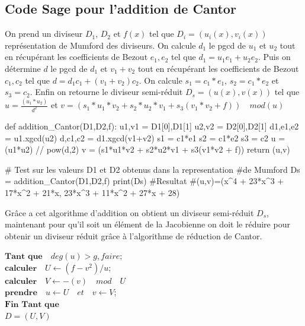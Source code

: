 \documentclass[12pt,a4paper]{article}
\begin{document}
	\subsection*{Code Sage pour l'addition de Cantor}
	On prend un diviseur $D_1$, $D_2$ et $f(x)$ tel que $D_i=(u_i(x),v_i(x))$ représentation de Mumford des diviseurs. On calcule $d_1$ le pgcd de $u_1$ et $u_2$ tout en récupérant les coefficients de Bezout $e_1, e_2$ tel que $d_1 = u_1e_1 + u_2e_2$. Puis on détermine $d$ le pgcd de $d_1$ et $v_1+v_2$ tout en récupérant les coefficients de Bezout $c_1,c_2$ tel que $d = d_1c_1 + (v_1 + v_2)c_2$. On calcule $s_1 = c_1 * e_1$, $s_2 = c_1 * e_2$ et $s_3 = c_2$. Enfin on retourne le diviseur semi-réduit $D_s = (u(x),v(x))$ tel que $u = \frac{(u_1*u_2)}{d^2}$ et $ v = (s_1*u_1*v_2 + s_2*u_2*v_1 + s_3(v_1*v_2 + f))\quad mod(u)$ 
	\begin{sageblock}
		
		def addition_Cantor(D1,D2,f):
			u1,v1 = D1[0],D1[1]
			u2,v2 = D2[0],D2[1]
			d1,e1,e2 =  u1.xgcd(u2)
			d,c1,c2 =  d1.xgcd(v1+v2)
			s1 = c1*e1
			s2 = c1*e2
			s3 = c2
			u = (u1*u2) // pow(d,2) 
			v = (s1*u1*v2 + s2*u2*v1 + s3(v1*v2 + f)) %
			return (u,v)
			
		# Test sur les valeurs D1 et D2 obtenus dans la representation 
		#de Mumford
		Ds = addition_Cantor(D1,D2,f)
		print(Ds)
		#Resultat 
		#(u,v)=(x^4 + 23*x^3 + 17*x^2 + 21*x, 23*x^3 + 11*x^2 + 27*x + 28)
	\end{sageblock}
	Grâce a cet algorithme d'addition on obtient un diviseur semi-réduit $D_s$, maintenant pour qu'il soit un élément de la Jacobienne on doit le réduire pour obtenir un diviseur réduit grâce \`a l'algorithme de réduction de Cantor.   \\ 
	\vspace{1cm}
	\begin{algorithm}[H] 
		\caption{Algorithme de réduction de Cantor}
		\label{alg:reductioncantor}
		
		$\textbf{Tant que}\quad deg(u) > g, faire;$\\
		\hspace*{1cm}$\textbf{calculer}\quad U \leftarrow (f-v^2)/u$;\\
		\hspace*{1cm}$\textbf{calculer}\quad V \leftarrow -(v)\quad mod \quad U$\\
		\hspace*{1cm}$\textbf{prendre}\quad u \leftarrow U \quad et\quad v \leftarrow V$;\\
		$\textbf{Fin Tant que}$\\
		\Return $D =(U,V)$\;
	\end{algorithm}
\end{document}
